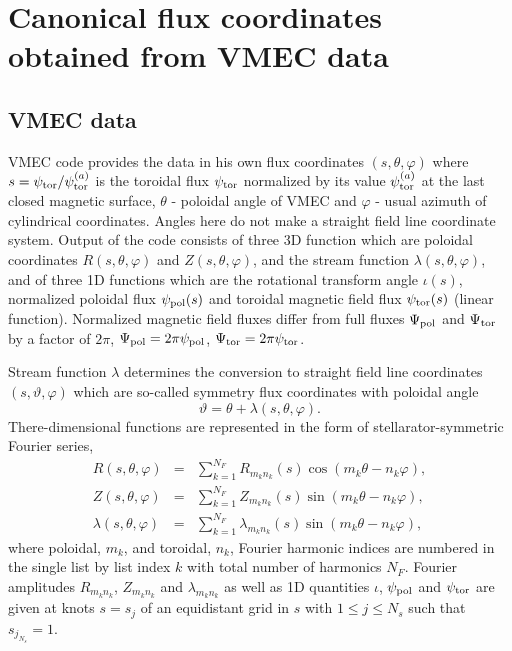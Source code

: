 \documentclass[12pt]{article}
\newcommand{\be}[1]{\begin{equation} \label{#1}}
\newcommand{\ee}{\end{equation}}
\newcommand{\bea}[1]{\begin{eqnarray} \label{#1}}
\newcommand{\eea}{\end{eqnarray}}
\begin{document}
\section{Canonical flux coordinates obtained from VMEC data}

\subsection{VMEC data}
\label{ssec:vmecdata}

VMEC code provides the data in his own flux coordinates $(s,\theta,\varphi)$ where 
$s=\psi_{\rm tor}/\psi_{\rm tor}^{(a)}$ is the toroidal flux $\psi_{\rm tor}$ normalized 
by its value $\psi_{\rm tor}^{(a)}$ at the last closed magnetic surface, 
$\theta$ - poloidal angle of VMEC and $\varphi$ - usual azimuth of cylindrical coordinates.
Angles here do not make a straight field line coordinate system.
Output of the code consists of three 3D function which are poloidal coordinates $R(s,\theta,\varphi)$ 
and $Z(s,\theta,\varphi)$, and the stream function $\lambda(s,\theta,\varphi)$, and of three 1D functions
which are the rotational transform angle $\iota(s)$, normalized poloidal flux $\psi_{\rm pol}(s)$ and
toroidal magnetic field flux $\psi_{\rm tor}(s)$ (linear function). Normalized magnetic field fluxes 
differ from full fluxes $\Psi_{\rm pol}$ and $\Psi_{\rm tor}$ by a factor of $2\pi$,
$\Psi_{\rm pol}=2\pi\psi_{\rm pol}$, $\Psi_{\rm tor}=2\pi\psi_{\rm tor}$.

\noindent
Stream function $\lambda$ determines the conversion to straight field line coordinates $(s,\vartheta,\varphi)$
which are so-called symmetry flux coordinates with poloidal angle
\be{defpolangle}
\vartheta = \theta + \lambda(s,\theta,\varphi).
\ee
There-dimensional functions are represented in the form of stellarator-symmetric Fourier series,
\bea{stelsymseries}
R(s,\theta,\varphi) &=& \sum_{k=1}^{N_F} R_{m_k n_k}(s)\cos(m_k\theta-n_k\varphi),
\nonumber \\
Z(s,\theta,\varphi) &=& \sum_{k=1}^{N_F} Z_{m_k n_k}(s)\sin(m_k\theta-n_k\varphi),
\\
\lambda(s,\theta,\varphi) &=& \sum_{k=1}^{N_F} \lambda_{m_k n_k}(s)\sin(m_k\theta-n_k\varphi),
\nonumber
\eea
where poloidal, $m_k$, and toroidal, $n_k$, Fourier harmonic indices are numbered in the single list by list index $k$
with total number of harmonics $N_F$. Fourier amplitudes $R_{m_k n_k}$, $Z_{m_k n_k}$ and $\lambda_{m_k n_k}$ as well
as 1D quantities $\iota$, $\psi_{\rm pol}$ and $\psi_{\rm tor}$ are given at knots $s=s_j$ of an equidistant grid 
in $s$ with $1\le j \le N_s$ such that $s_{j_{N_s}}=1$.
\end{document}
